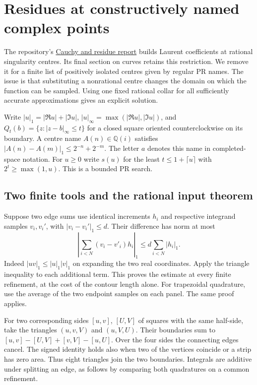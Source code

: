 \section{Residues at constructively named complex points}
\label{sec:movingres}

The repository's \href{https://github.com/VladimirReshetnikov/ProveIt/blob/5f3be02388442f16487d2dc5c2529961dd783d2b/Logic/PrimitiveRecursiveArithmetic/docs/proofs/analysis/cauchy_residue_ipra/report.tex}{Cauchy and residue report}
builds Laurent coefficients at rational singularity centres. Its final section on curves retains this restriction. We remove it for a finite list of positively isolated centres given by regular PR names. The issue is that substituting a nonrational centre changes the domain on which the function can be sampled. Using one fixed rational collar for all sufficiently accurate approximations gives an explicit solution.

Write $|u|_1=|\Re u|+|\Im u|$, $|u|_\infty=\max(|\Re u|,|\Im u|)$, and $Q_t(b)=\{z:|z-b|_\infty\le t\}$ for a closed square oriented counterclockwise on its boundary. A centre name $A(n)\in\mathbb Q(i)$ satisfies
$|A(n)-A(m)|_1\le 2^{-n}+2^{-m}$. The letter $a$ denotes this name in completed-space notation. For $u\ge0$ write $s(u)$ for the least $t\le 1+\lceil u\rceil$ with $2^t\ge\max(1,u)$. This is a bounded PR search.

\subsection{Two finite tools and the rational input theorem}

Suppose two edge sums use identical increments $h_i$ and respective integrand samples $v_i,v_i'$, with $|v_i-v_i'|_1\le d$. Their difference has norm at most
\begin{equation}
 \left|\sum_{i<N}(v_i-v'_i)h_i\right|_1
 \le d\sum_{i<N}|h_i|_1. \label{eq:ccquad}
\end{equation}
Indeed $|uv|_1\le |u|_1|v|_1$ on expanding the two real coordinates. Apply the triangle inequality to each additional term. This proves the estimate at every finite refinement, at the cost of the contour length alone. For trapezoidal quadrature, use the average of the two endpoint samples on each panel. The same proof applies.

For two corresponding sides $[u,v]$, $[U,V]$ of squares with the same half-side, take the triangles $(u,v,V)$ and $(u,V,U)$. Their boundaries sum to
$[u,v]-[U,V]+[v,V]-[u,U]$. Over the four sides the connecting edges cancel. The signed identity holds also when two of the vertices coincide or a strip has zero area. Thus eight triangles join the two boundaries. Integrals are additive under splitting an edge, as follows by comparing both quadratures on a common refinement.

